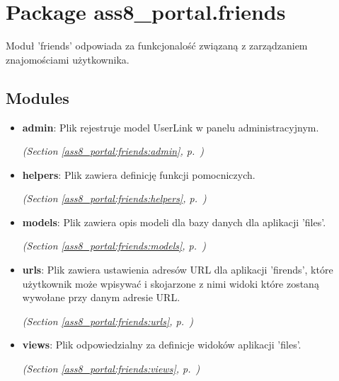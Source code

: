 %
%
%


\section{Package ass8\_portal.friends}

    \label{ass8_portal:friends}
Moduł 'friends' odpowiada za funkcjonalość związaną z zarządzaniem 
znajomościami użytkownika.



\subsection{Modules}

\begin{itemize}
\setlength{\parskip}{0ex}
\item \textbf{admin}: Plik rejestruje model UserLink w panelu administracyjnym.



  \textit{(Section \ref{ass8_portal:friends:admin}, p.~\pageref{ass8_portal:friends:admin})}

\item \textbf{helpers}: Plik zawiera definicję funkcji pomocniczych.



  \textit{(Section \ref{ass8_portal:friends:helpers}, p.~\pageref{ass8_portal:friends:helpers})}

\item \textbf{models}: Plik zawiera opis modeli dla bazy danych dla aplikacji 'files'.



  \textit{(Section \ref{ass8_portal:friends:models}, p.~\pageref{ass8_portal:friends:models})}

\item \textbf{urls}: 
Plik zawiera ustawienia adresów URL dla aplikacji 'firends', 
które użytkownik może wpisywać i skojarzone z nimi widoki które zostaną wywołane przy 
danym adresie URL. 


  \textit{(Section \ref{ass8_portal:friends:urls}, p.~\pageref{ass8_portal:friends:urls})}

\item \textbf{views}: Plik odpowiedzialny za definicje widoków aplikacji 'files'.



  \textit{(Section \ref{ass8_portal:friends:views}, p.~\pageref{ass8_portal:friends:views})}

\end{itemize}


